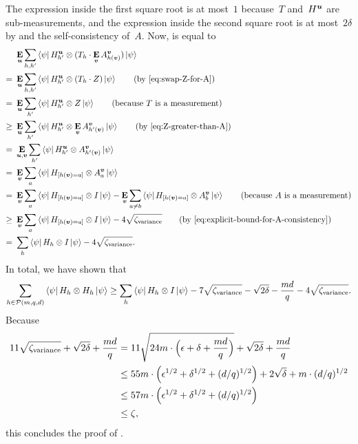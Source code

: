 The expression inside the first square root is at most~$1$ because~$T$ and~$H^{\boldsymbol{u}}$ are sub-measurements,
and the expression inside the second square root is at most~$2\delta$ by  and the self-consistency of~$A$.
Now,  is equal to
\begin{align*}
&\E_{\bu} \sum_{h, h'} \bra{\psi} H^{\bu}_{h'} \otimes (T_h\cdot \E_{\bv} A^{\bv}_{h(\bv)}) \ket{\psi}\\
=~& \E_{\bu} \sum_{h, h'} \bra{\psi} H^{\bu}_{h'} \otimes  (T_h\cdot Z)\ket{\psi} \tag{by \Cref{eq:swap-Z-for-A}}\\
=~& \E_{\bu} \sum_{ h'} \bra{\psi} H^{\bu}_{h'}  \otimes Z\ket{\psi} \tag{because~$T$ is a measurement}\\
\geq~& \E_{\bu} \sum_{ h'} \bra{\psi}  H^{\bu}_{h'} \otimes  \E_{\bv} A^{\bv}_{h'(\bv)} \ket{\psi} \tag{by \Cref{eq:Z-greater-than-A}}\\
=~& \E_{\bu, \bv} \sum_{ h'} \bra{\psi}  H^{\bu}_{h'} \otimes  A^{\bv}_{h'(\bv)} \ket{\psi}\\
=~& \E_{\bv} \sum_{a} \bra{\psi}  H_{[h(\bv)=a]} \otimes  A^{\bv}_{a} \ket{\psi}\\
=~& \E_{\bv} \sum_{a} \bra{\psi}  H_{[h(\bv)=a]} \otimes  I \ket{\psi} - \E_{\bv} \sum_{a\neq b} \bra{\psi}  H_{[h(\bv)=a]} \otimes  A^{\bv}_{b} \ket{\psi}\tag{because~$A$ is a measurement}\\
\geq~& \E_{\bv} \sum_{a} \bra{\psi}  H_{[h(\bv)=a]} \otimes  I \ket{\psi} - 4 \sqrt{\zeta_{\mathrm{variance}}} \tag{by \Cref{eq:explicit-bound-for-A-consistency}}\\
=~&  \sum_{h} \bra{\psi}  H_h \otimes  I \ket{\psi} - 4 \sqrt{\zeta_{\mathrm{variance}}}.
\end{align*}
In total, we have shown that
\begin{equation*}
\sum_{h\in\mathcal{P}(m, q, d)} \bra{\psi} H_h \otimes H_h \ket{\psi} \geq  \sum_{h} \bra{\psi}  H_h \otimes  I \ket{\psi} - 7 \sqrt{\zeta_{\mathrm{variance}}} - \sqrt{2\delta} - \frac{md}{q} - 4\sqrt{\zeta_{\mathrm{variance}}}.
\end{equation*}
Because
\begin{align*}
11 \sqrt{\zeta_{\mathrm{variance}}} + \sqrt{2\delta} + \frac{md}{q}
& = 11 \sqrt{24m\cdot\Big(\epsilon + \delta + \frac{md}{q}\Big)} + \sqrt{2\delta} + \frac{md}{q}\\
&\leq  55 m \cdot \Big(\epsilon^{1/2} + \delta^{1/2} + (d/q)^{1/2}\Big) + 2\sqrt{\delta} + m \cdot (d/q)^{1/2}\\
&\leq  57 m \cdot \Big(\epsilon^{1/2} + \delta^{1/2} + (d/q)^{1/2}\Big)\\
&\leq \zeta,
\end{align*}
this concludes the proof of .


